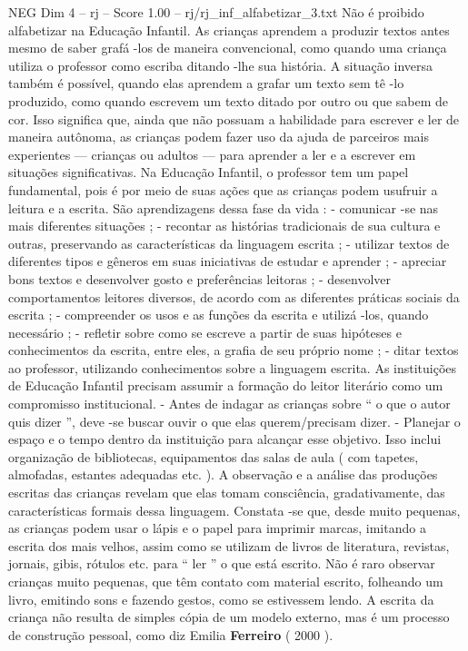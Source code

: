 \begin{textsample}{NEG Dim 4 – rj – Score 1.00 – rj/rj\_inf\_alfabetizar\_3.txt}
Não é proibido alfabetizar na Educação Infantil.
As crianças aprendem a produzir textos antes mesmo de saber grafá -los de maneira convencional, como quando uma criança utiliza o professor como escriba ditando -lhe sua história.
A situação inversa também é possível, quando elas aprendem a grafar um texto sem tê -lo produzido, como quando escrevem um texto ditado por outro ou que sabem de cor.
Isso significa que, ainda que não possuam a habilidade para escrever e ler de maneira autônoma, as crianças podem fazer uso da ajuda de parceiros mais experientes — crianças ou adultos — para aprender a ler e a escrever em situações significativas.
Na Educação Infantil, o professor tem um papel fundamental, pois é por meio de suas ações que as crianças podem usufruir a leitura e a escrita.
São aprendizagens dessa fase da vida : - comunicar -se nas mais diferentes situações ; - recontar as histórias tradicionais de sua cultura e outras, preservando as características da linguagem escrita ; - utilizar textos de diferentes tipos e gêneros em suas iniciativas de estudar e aprender ; - apreciar bons textos e desenvolver gosto e preferências leitoras ; - desenvolver comportamentos leitores diversos, de acordo com as diferentes práticas sociais da escrita ; - compreender os usos e as funções da escrita e utilizá -los, quando necessário ; - refletir sobre como se escreve a partir de suas hipóteses e conhecimentos da escrita, entre eles, a grafia de seu próprio nome ; - ditar textos ao professor, utilizando conhecimentos sobre a linguagem escrita.
As instituições de Educação Infantil precisam assumir a formação do leitor literário como um compromisso institucional. - Antes de indagar as crianças sobre “ o que o autor quis dizer ”, deve -se buscar ouvir o que elas querem/precisam dizer. - Planejar o espaço e o tempo dentro da instituição para alcançar esse objetivo.
Isso inclui organização de bibliotecas, equipamentos das salas de aula ( com tapetes, almofadas, estantes adequadas etc. ).
A observação e a análise das produções escritas das crianças revelam que elas tomam consciência, gradativamente, das características formais dessa linguagem.
Constata -se que, desde muito pequenas, as crianças podem usar o lápis e o papel para imprimir marcas, imitando a escrita dos mais velhos, assim como se utilizam de livros de literatura, revistas, jornais, gibis, rótulos etc. para “ ler ” o que está escrito.
Não é raro observar crianças muito pequenas, que têm contato com material escrito, folheando um livro, emitindo sons e fazendo gestos, como se estivessem lendo.
A escrita da criança não resulta de simples cópia de um modelo externo, mas é um processo de construção pessoal, como diz Emilia \textbf{Ferreiro} ( 2000 ).

\end{textsample}

